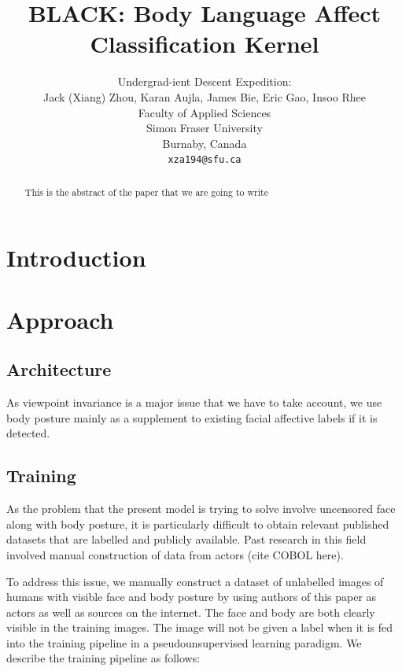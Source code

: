 \documentclass{article}
\title{BLACK: Body Language Affect Classification Kernel}
\author{
  Undergrad-ient Descent Expedition: \\
  Jack (Xiang) Zhou, Karan Aujla, James Bie, Eric Gao, Insoo Rhee\\
  Faculty of Applied Sciences\\
  Simon Fraser University\\
  Burnaby, Canada\\
  \texttt{xza194@sfu.ca} \\
}
\begin{document}
\maketitle

\begin{abstract}
  This is the abstract of the paper that we are going to write
\end{abstract}

\section{Introduction}

\section{Approach}
\subsection{Architecture}

As viewpoint invariance is a major issue that we have to take account, we use body posture mainly as a supplement to existing facial affective labels if it is detected.


\subsection{Training}
As the problem that the present model is trying to solve involve uncensored face along with body posture, it is particularly difficult to obtain relevant published datasets that are labelled and publicly available. Past research in this field involved manual construction of data from actors (cite COBOL here).

To address this issue, we manually construct a dataset of unlabelled images of humans with visible face and body posture by using authors of this paper as actors as well as sources on the internet. The face and body are both clearly visible in the training images. The image will not be given a label when it is fed into the training pipeline in a pseudounsupervised learning paradigm. We describe the training pipeline as follows:
\end{document}
